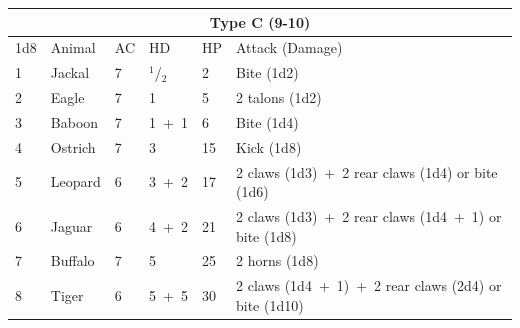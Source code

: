 \noindent \begin{tabular}{|p{}|p{}|p{}|p{}|p{}|p{}|}
\multicolumn{6}{c}{Type C (9-10)} \\
\hline
1d8	& Animal	& AC	& HD	& HP	& Attack (Damage) \\
\hline\hline
\rowcolor[gray]{0.9}1	& Jackal	& 7	& $^1$/$_2$	& 2	& Bite (1d2) \\
2	& Eagle		& 7	& 1		& 5	& 2 talons (1d2) \\
\rowcolor[gray]{0.9}3	& Baboon	& 7	& 1~+~1	& 6	& Bite (1d4) \\
4	& Ostrich	& 7	& 3		& 15	& Kick (1d8) \\
\rowcolor[gray]{0.9}5	& Leopard	& 6	& 3~+~2	& 17	& 2 claws (1d3)~+~2 rear claws (1d4) or bite (1d6) \\
6	& Jaguar	& 6	& 4~+~2	& 21	& 2 claws (1d3)~+~2 rear claws (1d4~+~1) or bite (1d8) \\
\rowcolor[gray]{0.9}7	& Buffalo	& 7	& 5		& 25	& 2 horns (1d8) \\
8	& Tiger		& 6	& 5~+~5	& 30	& 2 claws (1d4~+~1)~+~2 rear claws (2d4) or bite (1d10) \\
\hline
\end{tabular}

